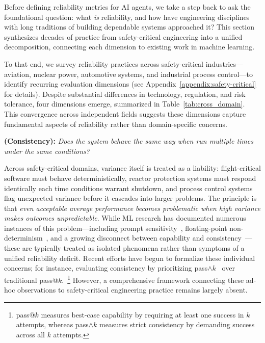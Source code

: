 \documentclass[11pt]{article}
\newcounter{dimension}
\begin{document}
Before defining reliability metrics for AI agents, we take a step back to ask the foundational question: what \emph{is} reliability, and how have engineering disciplines with long traditions of building dependable systems approached it?
This section synthesizes decades of practice from safety-critical engineering into a unified decomposition, connecting each dimension to existing work in machine learning.

To that end, we survey reliability practices across safety-critical industries---aviation, nuclear power, automotive systems, and industrial process control---to identify recurring evaluation dimensions (see Appendix~\ref{appendix:safety-critical} for details). Despite substantial differences in technology, regulation, and risk tolerance, four dimensions emerge, summarized in Table~\ref{tab:cross_domain}. This convergence across independent fields suggests these dimensions capture fundamental aspects of reliability rather than domain-specific concerns.

\begin{dimensionbox}
\textbf{(Consistency):} \textit{Does the system behave the same way when run multiple times under the same conditions?}
\end{dimensionbox}
Across safety-critical domains, variance itself is treated as a liability: flight-critical software must behave deterministically, reactor protection systems must respond identically each time conditions warrant shutdown, and process control systems flag unexpected variance before it cascades into larger problems. The principle is that \emph{even acceptable average performance becomes problematic when high variance makes outcomes unpredictable}.
While ML research has documented numerous instances of this problem—including prompt sensitivity~\citep{razavi2025prompt}, floating-point non-determinism~\citep{he2025nondeterminism}, and a growing disconnect between capability and consistency~\citep{wang2025consistency}— these are typically treated as isolated phenomena rather than symptoms of a unified reliability deficit. Recent efforts have begun to formalize these individual concerns; for instance, evaluating consistency by prioritizing pass$\wedge k$~\citep{yao2024tau} over traditional pass$@k$.~\footnote{pass$@k$ measures best-case capability by requiring at least one success in $k$ attempts, whereas pass$\wedge k$ measures strict consistency by demanding success across all $k$ attempts.} However, a comprehensive framework connecting these ad-hoc observations to safety-critical engineering practice remains largely absent.
\end{document}
